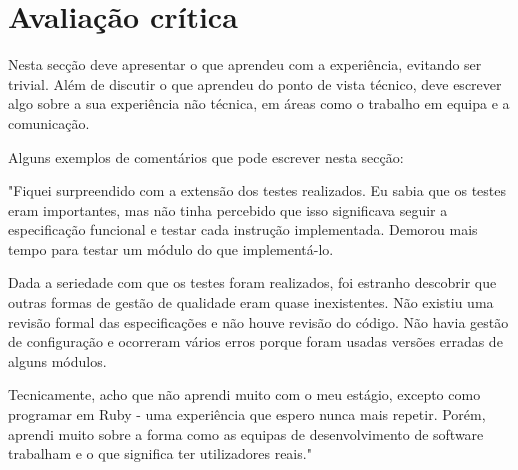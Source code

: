 \documentclass{article}
\begin{document}
\cleardoublepage
\section{Avaliação crítica}
Nesta secção deve apresentar o que aprendeu com a experiência, evitando ser trivial. Além de discutir o que aprendeu do ponto de vista técnico, deve escrever algo sobre a sua experiência não técnica, em áreas como o trabalho em equipa e a comunicação.

Alguns exemplos de comentários que pode escrever nesta secção:

"Fiquei surpreendido com a extensão dos testes realizados. Eu sabia que os testes eram importantes, mas não tinha percebido que isso significava seguir a especificação funcional e testar cada instrução implementada. Demorou mais tempo para testar um módulo do que  implementá-lo.

Dada a seriedade com que os testes foram realizados, foi estranho descobrir que outras formas de gestão de qualidade eram quase inexistentes. Não existiu uma revisão formal das especificações e não houve revisão do código. Não havia gestão de configuração e ocorreram vários erros porque foram usadas versões erradas de alguns módulos.

Tecnicamente, acho que não aprendi muito com o meu estágio, excepto como programar em Ruby - uma experiência que espero nunca mais repetir. Porém, aprendi muito sobre a forma como as equipas de desenvolvimento de software trabalham e o que significa ter utilizadores reais."


\cleardoublepage


\label{referencias}
\end{document}
